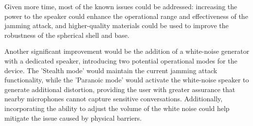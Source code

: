 Given more time, most of the known issues could be addressed: increasing the power to the speaker could enhance the operational range and effectiveness of the jamming attack, and higher-quality materials could be used to improve the robustness of the spherical shell and base.

Another significant improvement would be the addition of a white-noise generator with a dedicated speaker, introducing two potential operational modes for the device. 
The 'Stealth mode' would maintain the current jamming attack functionality, while the 'Paranoic mode' would activate the white-noise speaker to generate additional distortion, providing the user with greater assurance that nearby microphones cannot capture sensitive conversations.
Additionally, incorporating the ability to adjust the volume of the white noise could help mitigate the issue caused by physical barriers.